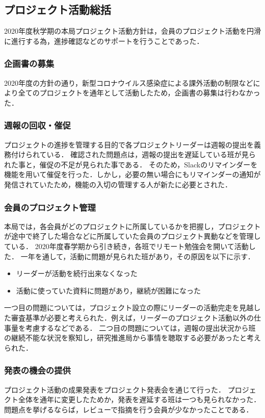 \subsection*{プロジェクト活動総括}


2020年度秋学期の本局プロジェクト活動方針は，会員のプロジェクト活動を円滑に進行する為，進捗確認などのサポートを行うことであった．

\subsubsection*{企画書の募集}

2020年度の方針の通り，新型コロナウイルス感染症による課外活動の制限などにより全てのプロジェクトを通年として活動したため，企画書の募集は行わなかった．

\subsubsection*{週報の回収・催促}

プロジェクトの進捗を管理する目的で各プロジェクトリーダーは週報の提出を義務付けられている．
確認された問題点は，週報の提出を遅延している班が見られた事と，催促の不足が見られた事である．
そのため，Slackのリマインダーを機能を用いて催促を行った．しかし，必要の無い場合にもリマインダーの通知が発信されていたため，機能の入切の管理する人が新たに必要とされた．

\subsubsection*{会員のプロジェクト管理}

本局では，各会員がどのプロジェクトに所属しているかを把握し，プロジェクトが途中で終了した場合などに所属していた会員のプロジェクト異動などを管理している．
2020年度春学期から引き続き，各班でリモート勉強会を開いて活動した．
一年を通して，活動に問題が見られた班があり，その原因を以下に示す．
\begin{itemize}
\item リーダーが活動を続行出来なくなった
\item 活動に使っていた資料に問題があり，継続が困難になった
\end{itemize}
一つ目の問題については，プロジェクト設立の際にリーダーの活動完走を見越した審査基準が必要と考えられた．例えば，リーダーのプロジェクト活動以外の仕事量を考慮するなどである．
二つ目の問題については，週報の提出状況から班の継続不能な状況を察知し，研究推進局から事情を聴取する必要があったと考えられた．

\subsubsection*{発表の機会の提供}
プロジェクト活動の成果発表をプロジェクト発表会を通じて行った．
プロジェクト全体を通年に変更したためか，発表を遅延する班は一つも見られなかった．
問題点を挙げるならば，レビューで指摘を行う会員が少なかったことである．
